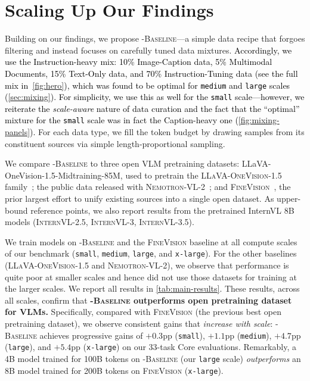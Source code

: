 \section{Scaling Up Our Findings}\label{sec:results}
Building on our findings, we propose \textsc{\dcvlm-Baseline}---a simple data recipe that forgoes filtering and instead focuses on carefully tuned data mixtures. 
\textcolor{black}{Accordingly, we use the Instruction-heavy mix: 10\% Image-Caption data, 5\% Multimodal Documents, 15\% Text-Only data, and 70\% Instruction-Tuning data (see the full mix in~\cref{fig:hero}), which was found to be optimal for \texttt{medium} and \texttt{large} scales (\cref{sec:mixing}). For simplicity, we use this as well for the \texttt{small} scale---however, we reiterate the \textit{scale-aware} nature of data curation and the fact that the ``optimal'' mixture for the \texttt{small} scale was in fact the Caption-heavy one (\cref{fig:mixing-panels}).}
For each data type, we fill the token budget by drawing samples from its constituent sources via simple length-proportional sampling.

We compare \textsc{\dcvlm-Baseline} to three open VLM pretraining datasets:  LLaVA-OneVision-1.5-Midtraining-85M, used to pretrain the \textsc{LLaVA-OneVision-1.5} family~\cite{an2025llava};  the public data released with \textsc{Nemotron-VL-2}~\cite{deshmukh2025nvidia}; and  \textsc{FineVision}~\cite{wiedmann2025finevision}, the prior largest effort to unify existing sources into a single open dataset. As upper-bound reference points, we also report results from the pretrained InternVL 8B models (\textsc{InternVL-2.5}, \textsc{InternVL-3}, \textsc{InternVL-3.5}).

We train models on \textsc{\dcvlm-Baseline} and the \textsc{FineVision} baseline at all compute scales of our benchmark (\texttt{small}, \texttt{medium}, \texttt{large}, and \texttt{x-large}). For the other baselines (\textsc{LLaVA-OneVision-1.5} and \textsc{Nemotron-VL-2}), we observe that performance is quite poor at smaller scales and hence did not use those datasets for training at the larger scales. We report all results in \cref{tab:main-results}.
These results, across all scales, confirm that \textbf{\textsc{\dcvlm-Baseline} outperforms open pretraining dataset for VLMs.}
Specifically, compared with \textsc{FineVision} (the previous best open pretraining dataset), we observe consistent gains that \emph{increase with scale}: \textsc{\dcvlm-Baseline} achieves progressive gains of $+0.3$pp (\texttt{small}), $+1.1$pp (\texttt{medium}), $+4.7$pp (\texttt{large}), and $+5.4$pp (\texttt{x-large}) on our 33-task Core evaluations.
Remarkably, a 4B model trained for 100B tokens on \textsc{\dcvlm-Baseline} (our \texttt{large} scale) \emph{outperforms} an 8B model trained for 200B tokens on \textsc{FineVision} (\texttt{x-large}).

